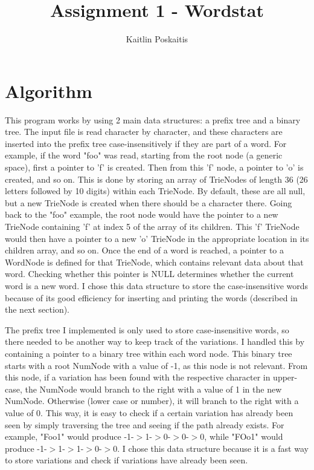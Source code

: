 \documentclass[11pt]{article}
\title{\bf Assignment 1 - Wordstat}
\author{Kaitlin Poskaitis}
\date{}
\begin{document}
\maketitle

\section*{Algorithm}

This program works by using 2 main data structures: a prefix tree and a binary
tree. The input file is read character by character, and these characters are
inserted into the prefix tree case-insensitively if they are part of a word.
For example, if the
word "foo" was read, starting from the root node (a generic space), first a
pointer to 'f' is created. Then from this 'f' node, a pointer to 'o' is
created, and so on.  This is done by storing an array of TrieNodes of length 36
(26 letters followed by 10 digits) within each TrieNode. By default, these are 
all null, but a new TrieNode is created when there should be a character there.
Going back to the "foo" example, the root node would have the pointer to a new 
TrieNode containing 'f' at index 5 of the array of its children.  This 'f' 
TrieNode would then have a pointer to a new 'o' TrieNode in the appropriate
location in its children array, and so on.
Once the end of a word is reached, a pointer to a WordNode is defined for that
TrieNode, which contains relevant data about that word. Checking whether this
pointer is NULL determines whether the current word is a new word.
I chose this data structure to store 
the case-insensitive words because of its good efficiency for inserting and
printing the words (described in the next section).

The prefix tree I implemented is only used to store case-insensitive words, so
there needed to be another way to keep track of the variations. I handled this 
by containing a pointer to a binary tree within each word node. This binary tree
starts with a root NumNode with a value of -1, as this node is not relevant.
From this node, if a variation has been found with the respective character in
upper-case, the NumNode would branch to the right with a value of 1 in the new
NumNode. Otherwise (lower case or number), it will branch to the right with a 
value of 0. This way, it is easy to check if a certain variation has already
been seen by simply traversing the tree and seeing if the path already exists.
For example, "Foo1" would produce -1-$>$1-$>$0-$>$0-$>$0, while "FOo1" would 
produce -1-$>$1-$>$1-$>$0-$>$0. I chose this data structure because it is a fast
way to store variations and check if variations have already been seen.
\end{document}

